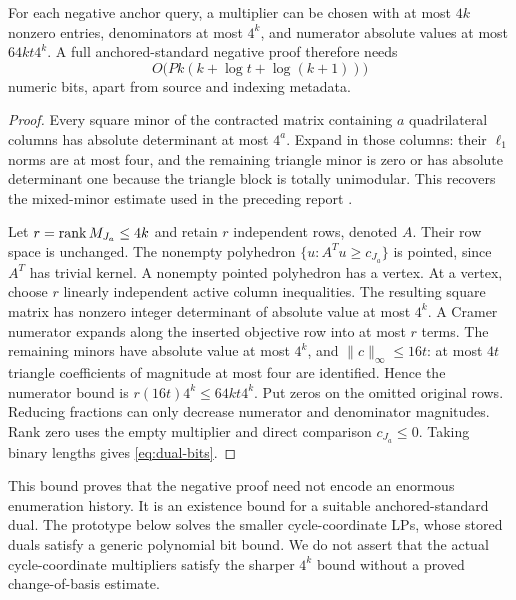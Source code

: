 \begin{proposition}\label{prop:dual-bits}
For each negative anchor query, a multiplier can be chosen with at most $4k$ nonzero entries, denominators at most $4^k$, and numerator absolute values at most $64kt4^k$. A full anchored-standard negative proof therefore needs
\begin{equation}\label{eq:dual-bits}
 O\bigl(Pk(k+\log t+\log(k+1))\bigr)
\end{equation}
numeric bits, apart from source and indexing metadata.
\end{proposition}
\begin{proof}
Every square minor of the contracted matrix containing $a$ quadrilateral columns has absolute determinant at most $4^a$. Expand in those columns: their $\ell_1$ norms are at most four, and the remaining triangle minor is zero or has absolute determinant one because the triangle block is totally unimodular. This recovers the mixed-minor estimate used in the preceding report \cite{priorKernel}.

Let $r=\operatorname{rank} M_{J_a}\le4k$ and retain $r$ independent rows, denoted $A$. Their row space is unchanged. The nonempty polyhedron $\{u:A^Tu\ge c_{J_a}\}$ is pointed, since $A^T$ has trivial kernel. A nonempty pointed polyhedron has a vertex. At a vertex, choose $r$ linearly independent active column inequalities. The resulting square matrix has nonzero integer determinant of absolute value at most $4^k$. A Cramer numerator expands along the inserted objective row into at most $r$ terms. The remaining minors have absolute value at most $4^k$, and $\|c\|_\infty\le16t$: at most $4t$ triangle coefficients of magnitude at most four are identified. Hence the numerator bound is $r(16t)4^k\le64kt4^k$. Put zeros on the omitted original rows. Reducing fractions can only decrease numerator and denominator magnitudes. Rank zero uses the empty multiplier and direct comparison $c_{J_a}\le0$. Taking binary lengths gives \eqref{eq:dual-bits}.
\end{proof}

This bound proves that the negative proof need not encode an enormous enumeration history. It is an existence bound for a suitable anchored-standard dual. The prototype below solves the smaller cycle-coordinate LPs, whose stored duals satisfy a generic polynomial bit bound. We do not assert that the actual cycle-coordinate multipliers satisfy the sharper $4^k$ bound without a proved change-of-basis estimate.

